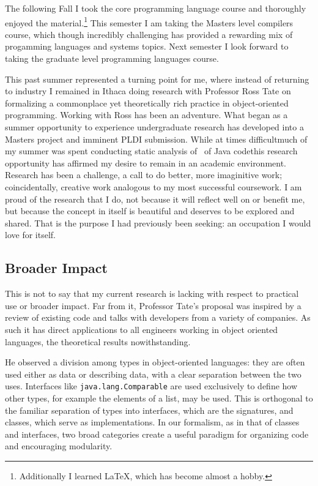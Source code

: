 \documentclass{article}
\begin{document}
The following Fall I took the core programming language course and thoroughly enjoyed the material.\footnote{Additionally I learned \LaTeX, which has become almost a hobby.}
This semester I am taking the Masters level compilers course, which though incredibly challenging has provided a rewarding mix of progamming languages and systems topics. 
Next semester I look forward to taking the graduate level programming languages course. %

This past summer represented a turning point for me, where instead of returning to industry I remained in Ithaca doing research with Professor Ross Tate on formalizing a commonplace yet theoretically rich practice in object-oriented programming.
Working with Ross has been an adventure.
What began as a summer opportunity to experience undergraduate research has developed into a Masters project and imminent PLDI submission.
While at times difficult\textemdash much of my summer was spent conducting static analysis of \sloc\ of Java code\textemdash this research opportunity has affirmed my desire to remain in an academic environment.
Research has been a challenge, a call to do better, more imaginitive work; coincidentally, creative work analogous to my most successful coursework.
I am proud of the research that I do, not because it will reflect well on or benefit me, but because the concept in itself is beautiful and deserves to be explored and shared.
That is the purpose I had previously been seeking: an occupation I would love for itself.

\subsection*{Broader Impact}
This is not to say that my current research is lacking with respect to practical use or broader impact.
Far from it, Professor Tate's proposal was inspired by a review of existing code and talks with developers from a variety of companies.
As such it has direct applications to all engineers working in object oriented languages, the theoretical results nowithstanding.

He observed a division among types in object-oriented languages: they are often used either as data or describing data, with a clear separation between the two uses.
Interfaces like \texttt{java.lang.Comparable} are used exclusively to define how other types, for example the elements of a list, may be used.
This is orthogonal to the familiar separation of types into interfaces, which are the signatures, and classes, which serve as implementations.
In our formalism, as in that of classes and interfaces, two broad categories create a useful paradigm for organizing code and encouraging modularity.
\end{document}
